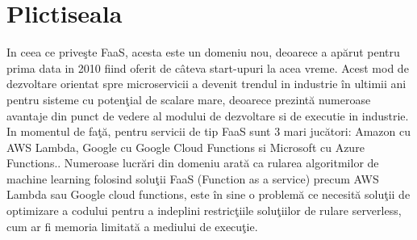 \documentclass[a4paper,12pt]{report}
\begin{document}
\chapter{Plictiseala}
In ceea ce priveşte FaaS, acesta este un domeniu nou, deoarece a apărut pentru prima data in 2010 fiind oferit de câteva start-upuri la acea vreme. Acest mod de dezvoltare orientat spre microservicii a devenit trendul in industrie în ultimii ani pentru sisteme cu potenţial de scalare mare, deoarece prezintă numeroase avantaje din punct de vedere al modului de dezvoltare si de executie in industrie. In momentul de faţă, pentru servicii de tip FaaS sunt 3 mari jucători: Amazon cu AWS Lambda, Google cu Google Cloud Functions si Microsoft cu Azure Functions.\cite{jonas2019cloud}. Numeroase lucrări din domeniu \cite{christidis2019, wang2019} arată ca rularea algoritmilor de machine learning folosind soluţii FaaS (Function as a service) precum AWS Lambda sau Google cloud functions, este în sine o problemă ce necesită soluţii de optimizare a codului pentru a indeplini restricţiile soluţiilor de rulare serverless, cum ar fi memoria limitată a mediului de execuţie. 



\end{document}
